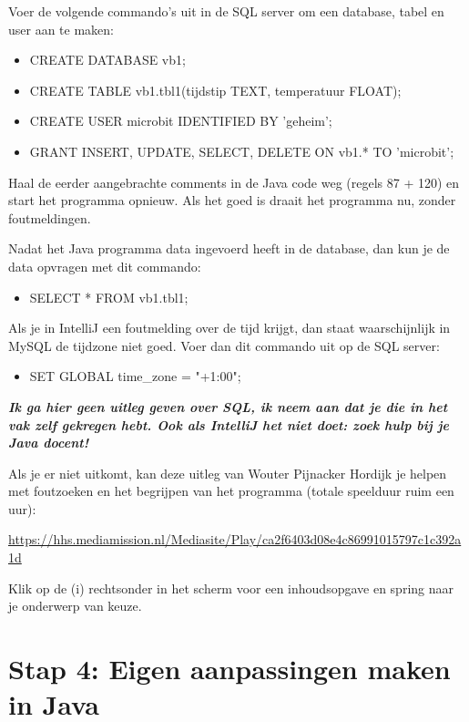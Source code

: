 Voer de volgende commando's uit in de SQL server om een database, tabel en user aan te maken:

\begin{itemize}
	\item  CREATE DATABASE vb1;
	\item  CREATE TABLE vb1.tbl1(tijdstip TEXT, temperatuur FLOAT);
	\item  CREATE USER microbit IDENTIFIED BY 'geheim';
	\item  GRANT INSERT, UPDATE, SELECT, DELETE ON vb1.* TO 'microbit';
\end{itemize}

Haal de eerder aangebrachte comments in de Java code weg (regels 87 + 120) en start het programma opnieuw. Als het goed is draait het programma nu, zonder foutmeldingen.

Nadat het Java programma data ingevoerd heeft in de database, dan kun je de data opvragen met dit commando:

\begin{itemize}
	\item SELECT * FROM vb1.tbl1;
\end{itemize}

Als je in IntelliJ een foutmelding over de tijd krijgt, dan staat waarschijnlijk in MySQL de tijdzone niet goed. Voer dan dit commando uit op de SQL server:

\begin{itemize}
	\item SET GLOBAL time\_zone = "+1:00"; 
\end{itemize}

\textbf{\textit{Ik ga hier geen uitleg geven over SQL, ik neem aan dat je die in het vak zelf gekregen hebt.
Ook als IntelliJ het niet doet: zoek hulp bij je Java docent!}}

Als je er niet uitkomt, kan deze uitleg van Wouter Pijnacker Hordijk je helpen met foutzoeken en het begrijpen van het programma (totale speelduur ruim een uur):

\href{https://hhs.mediamission.nl/Mediasite/Play/ca2f6403d08e4c86991015797c1c392a1d}{https://hhs.mediamission.nl/Mediasite/Play/ca2f6403d08e4c86991015797c1c392a1d}

Klik op de (i) rechtsonder in het scherm voor een inhoudsopgave en spring naar je onderwerp van keuze.

\section{Stap 4: Eigen aanpassingen maken in Java}

